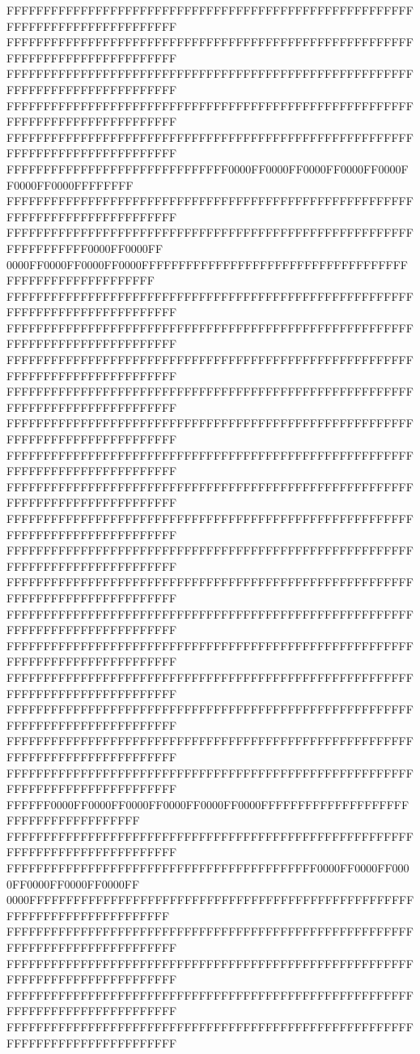 FFFFFFFFFFFFFFFFFFFFFFFFFFFFFFFFFFFFFFFFFFFFFFFFFFFFFFFFFFFFFFFFFFFFFFFFFFFFFF
FFFFFFFFFFFFFFFFFFFFFFFFFFFFFFFFFFFFFFFFFFFFFFFFFFFFFFFFFFFFFFFFFFFFFFFFFFFFFF
FFFFFFFFFFFFFFFFFFFFFFFFFFFFFFFFFFFFFFFFFFFFFFFFFFFFFFFFFFFFFFFFFFFFFFFFFFFFFF
FFFFFFFFFFFFFFFFFFFFFFFFFFFFFFFFFFFFFFFFFFFFFFFFFFFFFFFFFFFFFFFFFFFFFFFFFFFFFF
FFFFFFFFFFFFFFFFFFFFFFFFFFFFFFFFFFFFFFFFFFFFFFFFFFFFFFFFFFFFFFFFFFFFFFFFFFFFFF
FFFFFFFFFFFFFFFFFFFFFFFFFFFFFF0000FF0000FF0000FF0000FF0000FF0000FF0000FFFFFFFF
FFFFFFFFFFFFFFFFFFFFFFFFFFFFFFFFFFFFFFFFFFFFFFFFFFFFFFFFFFFFFFFFFFFFFFFFFFFFFF
FFFFFFFFFFFFFFFFFFFFFFFFFFFFFFFFFFFFFFFFFFFFFFFFFFFFFFFFFFFFFFFFFF0000FF0000FF
0000FF0000FF0000FF0000FFFFFFFFFFFFFFFFFFFFFFFFFFFFFFFFFFFFFFFFFFFFFFFFFFFFFFFF
FFFFFFFFFFFFFFFFFFFFFFFFFFFFFFFFFFFFFFFFFFFFFFFFFFFFFFFFFFFFFFFFFFFFFFFFFFFFFF
FFFFFFFFFFFFFFFFFFFFFFFFFFFFFFFFFFFFFFFFFFFFFFFFFFFFFFFFFFFFFFFFFFFFFFFFFFFFFF
FFFFFFFFFFFFFFFFFFFFFFFFFFFFFFFFFFFFFFFFFFFFFFFFFFFFFFFFFFFFFFFFFFFFFFFFFFFFFF
FFFFFFFFFFFFFFFFFFFFFFFFFFFFFFFFFFFFFFFFFFFFFFFFFFFFFFFFFFFFFFFFFFFFFFFFFFFFFF
FFFFFFFFFFFFFFFFFFFFFFFFFFFFFFFFFFFFFFFFFFFFFFFFFFFFFFFFFFFFFFFFFFFFFFFFFFFFFF
FFFFFFFFFFFFFFFFFFFFFFFFFFFFFFFFFFFFFFFFFFFFFFFFFFFFFFFFFFFFFFFFFFFFFFFFFFFFFF
FFFFFFFFFFFFFFFFFFFFFFFFFFFFFFFFFFFFFFFFFFFFFFFFFFFFFFFFFFFFFFFFFFFFFFFFFFFFFF
FFFFFFFFFFFFFFFFFFFFFFFFFFFFFFFFFFFFFFFFFFFFFFFFFFFFFFFFFFFFFFFFFFFFFFFFFFFFFF
FFFFFFFFFFFFFFFFFFFFFFFFFFFFFFFFFFFFFFFFFFFFFFFFFFFFFFFFFFFFFFFFFFFFFFFFFFFFFF
FFFFFFFFFFFFFFFFFFFFFFFFFFFFFFFFFFFFFFFFFFFFFFFFFFFFFFFFFFFFFFFFFFFFFFFFFFFFFF
FFFFFFFFFFFFFFFFFFFFFFFFFFFFFFFFFFFFFFFFFFFFFFFFFFFFFFFFFFFFFFFFFFFFFFFFFFFFFF
FFFFFFFFFFFFFFFFFFFFFFFFFFFFFFFFFFFFFFFFFFFFFFFFFFFFFFFFFFFFFFFFFFFFFFFFFFFFFF
FFFFFFFFFFFFFFFFFFFFFFFFFFFFFFFFFFFFFFFFFFFFFFFFFFFFFFFFFFFFFFFFFFFFFFFFFFFFFF
FFFFFFFFFFFFFFFFFFFFFFFFFFFFFFFFFFFFFFFFFFFFFFFFFFFFFFFFFFFFFFFFFFFFFFFFFFFFFF
FFFFFFFFFFFFFFFFFFFFFFFFFFFFFFFFFFFFFFFFFFFFFFFFFFFFFFFFFFFFFFFFFFFFFFFFFFFFFF
FFFFFFFFFFFFFFFFFFFFFFFFFFFFFFFFFFFFFFFFFFFFFFFFFFFFFFFFFFFFFFFFFFFFFFFFFFFFFF
FFFFFF0000FF0000FF0000FF0000FF0000FF0000FFFFFFFFFFFFFFFFFFFFFFFFFFFFFFFFFFFFFF
FFFFFFFFFFFFFFFFFFFFFFFFFFFFFFFFFFFFFFFFFFFFFFFFFFFFFFFFFFFFFFFFFFFFFFFFFFFFFF
FFFFFFFFFFFFFFFFFFFFFFFFFFFFFFFFFFFFFFFFFF0000FF0000FF0000FF0000FF0000FF0000FF
0000FFFFFFFFFFFFFFFFFFFFFFFFFFFFFFFFFFFFFFFFFFFFFFFFFFFFFFFFFFFFFFFFFFFFFFFFFF
FFFFFFFFFFFFFFFFFFFFFFFFFFFFFFFFFFFFFFFFFFFFFFFFFFFFFFFFFFFFFFFFFFFFFFFFFFFFFF
FFFFFFFFFFFFFFFFFFFFFFFFFFFFFFFFFFFFFFFFFFFFFFFFFFFFFFFFFFFFFFFFFFFFFFFFFFFFFF
FFFFFFFFFFFFFFFFFFFFFFFFFFFFFFFFFFFFFFFFFFFFFFFFFFFFFFFFFFFFFFFFFFFFFFFFFFFFFF
FFFFFFFFFFFFFFFFFFFFFFFFFFFFFFFFFFFFFFFFFFFFFFFFFFFFFFFFFFFFFFFFFFFFFFFFFFFFFF
